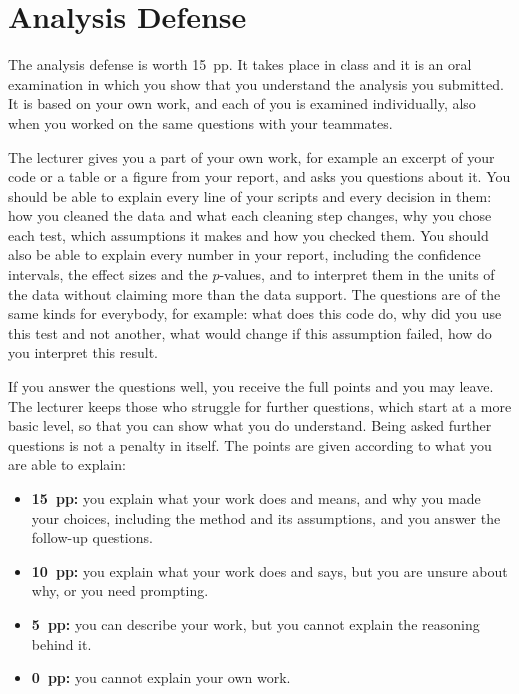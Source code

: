 \documentclass[11pt,a4paper]{article}
\begin{document}
\clearpage
\section{Analysis Defense}\label{sec:defense}

The analysis defense is worth 15~pp. It takes place in class and it is an oral examination in which you show that you understand the analysis you submitted. It is based on your own work, and each of you is examined individually, also when you worked on the same questions with your teammates.

The lecturer gives you a part of your own work, for example an excerpt of your code or a table or a figure from your report, and asks you questions about it. You should be able to explain every line of your scripts and every decision in them: how you cleaned the data and what each cleaning step changes, why you chose each test, which assumptions it makes and how you checked them. You should also be able to explain every number in your report, including the confidence intervals, the effect sizes and the $p$-values, and to interpret them in the units of the data without claiming more than the data support. The questions are of the same kinds for everybody, for example: what does this code do, why did you use this test and not another, what would change if this assumption failed, how do you interpret this result.

If you answer the questions well, you receive the full points and you may leave. The lecturer keeps those who struggle for further questions, which start at a more basic level, so that you can show what you do understand. Being asked further questions is not a penalty in itself. The points are given according to what you are able to explain:

\begin{itemize}
	\item \textbf{15~pp:} you explain what your work does and means, and why you made your choices, including the method and its assumptions, and you answer the follow-up questions.
	\item \textbf{10~pp:} you explain what your work does and says, but you are unsure about why, or you need prompting.
	\item \textbf{5~pp:} you can describe your work, but you cannot explain the reasoning behind it.
	\item \textbf{0~pp:} you cannot explain your own work.
\end{itemize}
\end{document}
